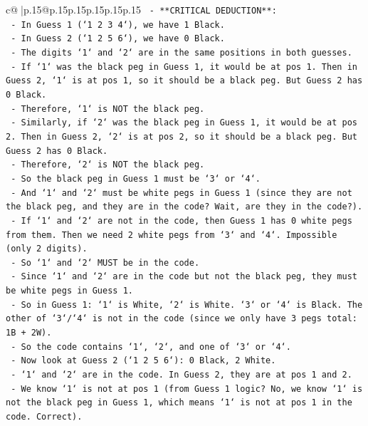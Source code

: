 \documentclass{article}
\begin{document}
{\begin{supertabular}{c@{$\;$}|p{.15\linewidth}@{}p{.15\linewidth}p{.15\linewidth}p{.15\linewidth}p{.15\linewidth}p{.15\linewidth}}
{{{\texttt{            {-} **CRITICAL DEDUCTION**:} \\
\texttt{                {-} In Guess 1 (`1 2 3 4`), we have 1 Black.} \\
\texttt{                {-} In Guess 2 (`1 2 5 6`), we have 0 Black.} \\
\texttt{                {-} The digits `1` and `2` are in the same positions in both guesses.} \\
\texttt{                {-} If `1` was the black peg in Guess 1, it would be at pos 1. Then in Guess 2, `1` is at pos 1, so it should be a black peg. But Guess 2 has 0 Black.} \\
\texttt{                {-} Therefore, `1` is NOT the black peg.} \\
\texttt{                {-} Similarly, if `2` was the black peg in Guess 1, it would be at pos 2. Then in Guess 2, `2` is at pos 2, so it should be a black peg. But Guess 2 has 0 Black.} \\
\texttt{                {-} Therefore, `2` is NOT the black peg.} \\
\texttt{                {-} So the black peg in Guess 1 must be `3` or `4`.} \\
\texttt{                {-} And `1` and `2` must be white pegs in Guess 1 (since they are not the black peg, and they are in the code? Wait, are they in the code?).} \\
\texttt{                {-} If `1` and `2` are not in the code, then Guess 1 has 0 white pegs from them. Then we need 2 white pegs from `3` and `4`. Impossible (only 2 digits).} \\
\texttt{                {-} So `1` and `2` MUST be in the code.} \\
\texttt{                {-} Since `1` and `2` are in the code but not the black peg, they must be white pegs in Guess 1.} \\
\texttt{                {-} So in Guess 1: `1` is White, `2` is White. `3` or `4` is Black. The other of `3`/`4` is not in the code (since we only have 3 pegs total: 1B + 2W).} \\
\texttt{                {-} So the code contains `1`, `2`, and one of `3` or `4`.} \\
\texttt{                {-} Now look at Guess 2 (`1 2 5 6`): 0 Black, 2 White.} \\
\texttt{                {-} `1` and `2` are in the code. In Guess 2, they are at pos 1 and 2.} \\
\texttt{                {-} We know `1` is not at pos 1 (from Guess 1 logic? No, we know `1` is not the black peg in Guess 1, which means `1` is not at pos 1 in the code. Correct).} \\
}}}
\end{supertabular}}
\end{document}
